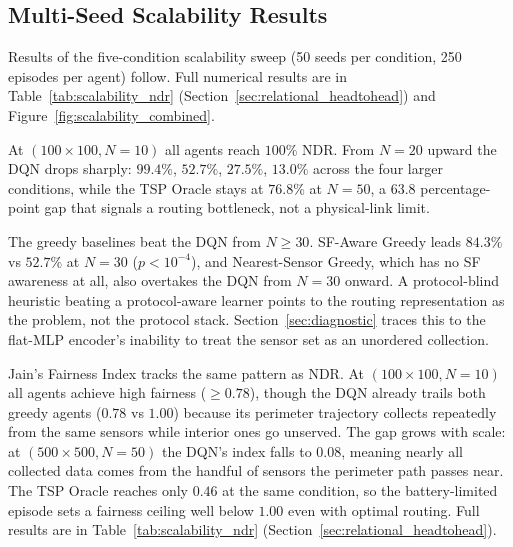 \subsection{Multi-Seed Scalability Results}
\label{sec:multi_condition}
\label{sec:multi_seed}
\label{sec:dqn_results}
\label{sec:scalability}

Results of the five-condition scalability sweep (50 seeds per condition, 250 episodes per agent) follow. Full numerical results are in Table~\ref{tab:scalability_ndr} (Section~\ref{sec:relational_headtohead}) and Figure~\ref{fig:scalability_combined}.

At $(100{\times}100, N{=}10)$ all agents reach $100\%$ NDR. From $N{=}20$ upward the DQN drops sharply: $99.4\%$, $52.7\%$, $27.5\%$, $13.0\%$ across the four larger conditions, while the TSP Oracle stays at $76.8\%$ at $N{=}50$, a $63.8$ percentage-point gap that signals a routing bottleneck, not a physical-link limit.

The greedy baselines beat the DQN from $N\ge 30$. SF-Aware Greedy leads $84.3\%$ vs $52.7\%$ at $N{=}30$ ($p < 10^{-4}$), and Nearest-Sensor Greedy, which has no SF awareness at all, also overtakes the DQN from $N{=}30$ onward. A protocol-blind heuristic beating a protocol-aware learner points to the routing representation as the problem, not the protocol stack. Section~\ref{sec:diagnostic} traces this to the flat-MLP encoder's inability to treat the sensor set as an unordered collection.

Jain's Fairness Index tracks the same pattern as NDR. At $(100{\times}100, N{=}10)$ all agents achieve high fairness ($\ge 0.78$), though the DQN already trails both greedy agents ($0.78$ vs $1.00$) because its perimeter trajectory collects repeatedly from the same sensors while interior ones go unserved. The gap grows with scale: at $(500{\times}500, N{=}50)$ the DQN's index falls to $0.08$, meaning nearly all collected data comes from the handful of sensors the perimeter path passes near. The TSP Oracle reaches only $0.46$ at the same condition, so the battery-limited episode sets a fairness ceiling well below $1.00$ even with optimal routing. Full results are in Table~\ref{tab:scalability_ndr} (Section~\ref{sec:relational_headtohead}).
